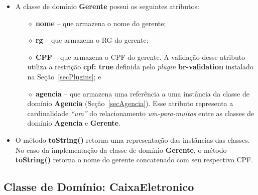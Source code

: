 \begin{itemize}

\item A classe de domínio {\bf Gerente} possui os seguintes atributos:

\vspace{0.5cm}

\begin{itemize}

\item[$\diamond$] {\bf nome} -- que armazena o nome do gerente; 

\vspace{0.5cm}

\item[$\diamond$] {\bf rg} -- que armazena o RG do gerente; 

\vspace{0.5cm}

\item[$\diamond$] {\bf CPF} -- que  armazena o CPF do gerente.  A
  validação desse  atributo utiliza a  restrição {\bf cpf: true}  definida pelo
  {\it plugin} {\bf br-validation} instalado na Seção~\ref{secPlugins}; e

\vspace{0.5cm}

\item[$\diamond$] {\bf agencia}  -- que armazena uma referência  a uma instância
  da classe  de domínio  {\bf Agencia} (Seção~\ref{secAgencia}).   Esse atributo
  representa a cardinalidade {\em ``um''} do relacionamento {\em um-para-muitos}
  entre as classes de domínio {\bf Agencia} e {\bf Gerente}.

\end{itemize}

\vspace{0.5cm}

\item O  método {\bf  toString()} retorna uma  representação das  instâncias das
  classes.   No caso  da implementação  da classe  de domínio  {\bf  Gerente}, o
  método  {\bf  toString()}  retorna  o  nome do  gerente  concatenado  com  seu
  respectivo CPF.

\end{itemize}

\newpage

\subsection{Classe de Domínio: CaixaEletronico}\label{secCaixaEletronico}

